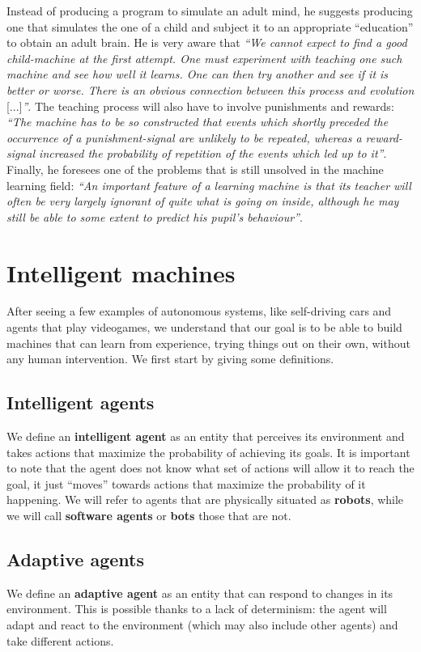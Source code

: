 Instead of producing a program to simulate an adult mind, he suggests producing one that simulates the one of a child and subject it to an appropriate ``education'' to obtain an adult brain. He is very aware that \textit{``We cannot expect to find a good child-machine at the first attempt. One must experiment with teaching one such machine and see how well it learns. One can then try another and see if it is better or worse. There is an obvious connection between this process and evolution} [...]\textit{''}. The teaching process will also have to involve punishments and rewards: \textit{``The machine has to be so constructed that events which shortly preceded the occurrence of a punishment-signal are unlikely to be repeated, whereas a reward-signal increased the probability of
repetition of the events which led up to it''}. Finally, he foresees one of the problems that is still unsolved in the machine learning field: \textit{``An important feature of a learning machine is that its teacher will often be very largely ignorant of quite what is going on inside, although he may
still be able to some extent to predict his pupil’s behaviour''}.

\section{Intelligent machines}
After seeing a few examples of autonomous systems, like self-driving cars and agents that play videogames, we understand that our goal is to be able to build machines that can learn from experience, trying things out on their own, without any human intervention. We first start by giving some definitions.

\subsection{Intelligent agents}
We define an \textbf{intelligent agent} as an entity that perceives its environment and takes actions that maximize the probability of achieving its goals. It is important to note that the agent does not know what set of actions will allow it to reach the goal, it just ``moves'' towards actions that maximize the probability of it happening. We will refer to agents that are physically situated as \textbf{robots}, while we will call \textbf{software agents} or \textbf{bots} those that are not.

\subsection{Adaptive agents}
We define an \textbf{adaptive agent} as an entity that can respond to changes in its environment. This is possible thanks to a lack of determinism: the agent will adapt and react to the environment (which may also include other agents) and take different actions.


